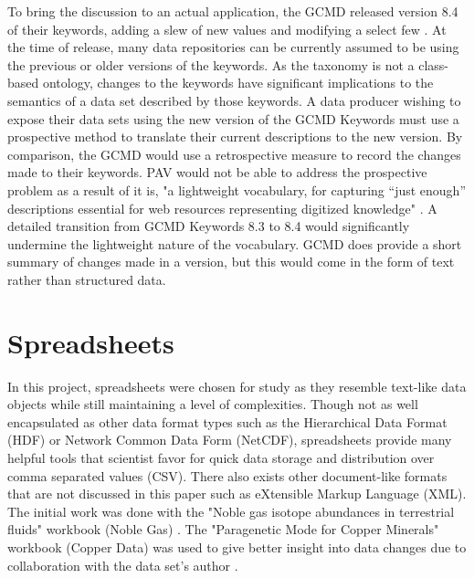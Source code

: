 To bring the discussion to an actual application, the GCMD released version 8.4 of their keywords, adding a slew of new values and modifying a select few \cite{Stevens2016}.
At the time of release, many data repositories can be currently assumed to be using the previous or older versions of the keywords.
As the taxonomy is not a class-based ontology, changes to the keywords have significant implications to the semantics of a data set described by those keywords.
A data producer wishing to expose their data sets using the new version of the GCMD Keywords must use a prospective method to translate their current descriptions to the new version.
By comparison, the GCMD would use a retrospective measure to record the changes made to their keywords.
PAV would not be able to address the prospective problem as a result of it is, "a lightweight vocabulary, for capturing “just enough” descriptions essential for web resources representing digitized knowledge" \cite{Ciccarese2013}.
A detailed transition from GCMD Keywords 8.3 to 8.4 would significantly undermine the lightweight nature of the vocabulary.
GCMD does provide a short summary of changes made in a version, but this would come in the form of text rather than structured data.

\section{Spreadsheets}

In this project, spreadsheets were chosen for study as they resemble text-like data objects while still maintaining a level of complexities.
Though not as well encapsulated as other data format types such as the Hierarchical Data Format (HDF) or Network Common Data Form (NetCDF), spreadsheets provide many helpful tools that scientist favor for quick data storage and distribution over comma separated values (CSV).
There also exists other document-like formats that are not discussed in this paper such as eXtensible Markup Language (XML).
The initial work was done with the "Noble gas isotope abundances in terrestrial fluids" workbook (Noble Gas) \cite{Polyak2015}.
The "Paragenetic Mode for Copper Minerals" workbook (Copper Data) was used to give better insight into data changes due to collaboration with the data set's author \cite{Morrison2016}.

